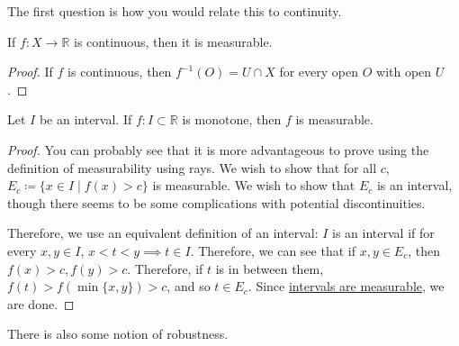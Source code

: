   The first question is how you would relate this to continuity. 

  \begin{theorem}
    \label{thm:continuous-functions-are-measurable}
    If $f: X \to \mathbb{R}$ is continuous, then it is measurable. 
  \end{theorem}
  \begin{proof}
    If $f$ is continuous, then $f^{-1} (O) = U \cap X$ for every open $O$ with open $U$. 
  \end{proof}

  \begin{theorem}
    \label{thm:monotonic-functions-are-measurable}
 
    Let $I$ be an interval. If $f: I \subset \mathbb{R}$ is monotone, then $f$ is measurable.
  \end{theorem}
  \begin{proof}
    You can probably see that it is more advantageous to prove using the definition of measurability using rays. We wish to show that for all $c$, $E_c \coloneqq \{x \in I \mid f(x) > c\}$ is measurable. We wish to show that $E_c$ is an interval, though there seems to be some complications with potential discontinuities. 

    Therefore, we use an equivalent definition of an interval: $I$ is an interval if for every $x, y \in I$, $x < t < y \implies t \in I$. Therefore, we can see that if $x, y \in E_c$, then $f(x) > c, f(y) > c$. Therefore, if $t$ is in between them, $f(t) > f(\min\{x, y\}) > c$, and so $t \in E_c$. Since \hyperref[thm:intervals-are-measurable]{intervals are measurable}, we are done. 
  \end{proof}

  There is also some notion of robustness. 

